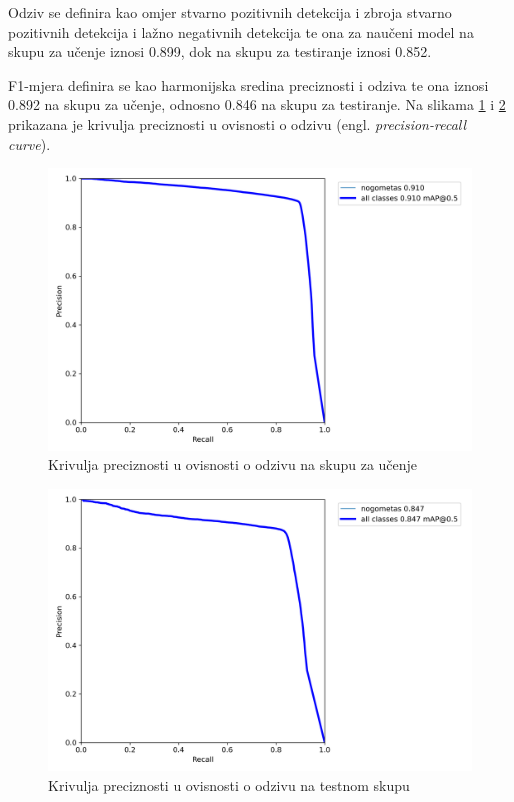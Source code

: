 \documentclass[times, utf8, seminar, numeric]{fer}
\begin{document}
Odziv se definira kao omjer stvarno pozitivnih detekcija i zbroja stvarno pozitivnih detekcija i lažno negativnih detekcija te ona za naučeni model na skupu za učenje iznosi 0.899, dok na skupu za testiranje iznosi 0.852.

F1-mjera definira se kao harmonijska sredina preciznosti i odziva te ona iznosi 0.892 na skupu za učenje, odnosno 0.846 na skupu za testiranje.
Na slikama \ref{fig:pr_curve_train} i \ref{fig:pr_curve_test}  prikazana je krivulja preciznosti u ovisnosti o odzivu (engl. \textit{precision-recall curve}).


\begin{figure}
	\centering
	\includegraphics[scale=0.5]{slike/PR_curve-train.png}
	\caption {Krivulja preciznosti u ovisnosti o odzivu na skupu za učenje}
	\label{fig:pr_curve_train}	
\end{figure}

\begin{figure}
	\centering
	\includegraphics[scale=0.5]{slike/PR_curve-test.png}
	\caption {Krivulja preciznosti u ovisnosti o odzivu na testnom skupu}
	\label{fig:pr_curve_test}
\end{figure}
\end{document}
